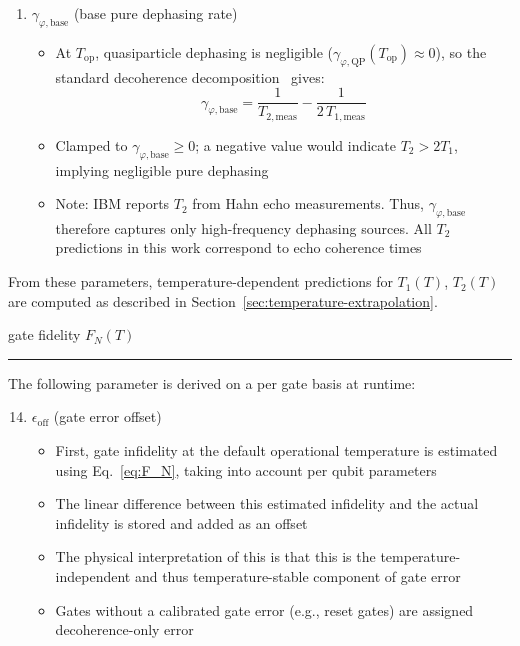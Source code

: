 \documentclass[showpacs,amsmath,amssymb,twocolumn,superscriptaddress,notitlepage,preprintnumbers,pra]{revtex4-1}
\begin{document}
\begin{enumerate}
	\item $\gamma_{\varphi,\mathrm{base}}$ (base pure dephasing rate)
	      \begin{itemize}
		      \item At $T_\mathrm{op}$, quasiparticle dephasing is negligible ($\gamma_{\varphi,\mathrm{QP}}(T_\mathrm{op}) \approx 0$), so the standard decoherence decomposition~\cite{krantz2019guide} gives:
		            \[
			            \gamma_{\varphi,\mathrm{base}} = \frac{1}{T_{2,\mathrm{meas}}} - \frac{1}{2\,T_{1,\mathrm{meas}}}
		            \]
		      \item Clamped to $\gamma_{\varphi,\mathrm{base}} \geq 0$; a negative value would indicate $T_2 > 2T_1$, implying negligible pure dephasing
		      \item Note: IBM reports $T_2$ from Hahn echo measurements. Thus, $\gamma_{\varphi,\mathrm{base}}$ therefore captures only high-frequency dephasing sources. All $T_2$ predictions in this work correspond to echo coherence times
	      \end{itemize}

\end{enumerate}

From these parameters, temperature-dependent predictions for $T_1(T)$, $T_2(T)$ are computed as described in Section~\ref{sec:temperature-extrapolation}.

gate fidelity $F_N(T)$

\noindent\rule{0.5\textwidth}{0.4pt}

The following parameter is derived on a per gate basis at runtime:

\begin{enumerate}
	\setcounter{enumi}{13}
	\item $\epsilon_\mathrm{off}$ (gate error offset)
	      \begin{itemize}
		      \item First, gate infidelity at the default operational temperature is estimated using Eq.~\eqref{eq:F_N}, taking into account per qubit parameters
		      \item The linear difference between this estimated infidelity and the actual infidelity is stored and added as an offset
		      \item The physical interpretation of this is that this is the temperature-independent and thus temperature-stable component of gate error
		      \item Gates without a calibrated gate error (e.g., reset gates) are assigned decoherence-only error
	      \end{itemize}
\end{enumerate}
\end{document}
